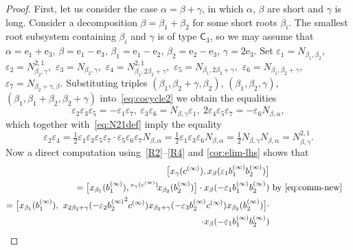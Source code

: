 \documentclass[oneside, 11pt]{amsart}
\numberwithin{equation}{section}
\theoremstyle{definition}
\theoremstyle{remark}
\newcommand{\up}[2]{{^{#1}\!{#2}}}
\newcommand{\rC}{\mathsf{C}}
\begin{document}
\begin{proof}
First, let us consider the case \(\alpha = \beta + \gamma\), in which \(\alpha\), \(\beta\) are short and \(\gamma\) is long. Consider a decomposition \(\beta = \beta_1 + \beta_2\) for some short roots \(\beta_i\). The smallest root subsystem containing \(\beta_i\) and \(\gamma\) is of type \(\rC_3\), so we may assume that \(\alpha = \mathrm e_1 + \mathrm e_3\), \(\beta = \mathrm e_1 - \mathrm e_3\), \(\beta_1 = \mathrm e_1 - \mathrm e_2\), \(\beta_2 = \mathrm e_2 - \mathrm e_3\), \(\gamma = 2\mathrm e_3\). Set $\varepsilon_1 = N_{\beta_1, \beta_2},$ $\varepsilon_2 = N_{\beta_2,\gamma}^{2,1},$ $\varepsilon_3 = N_{\beta_2, \gamma},$ $\varepsilon_4 = N_{\beta_1, 2\beta_2+\gamma}^{2,1},$ $\varepsilon_5 = N_{\beta_1, 2\beta_2+\gamma},$ $\varepsilon_6 = N_{\beta_1,\beta_2+\gamma},$ $\varepsilon_7 = N_{\beta_2+\gamma, \beta}.$
Substituting triples $(\beta_1, \beta_2+\gamma, \beta_2)$, $(\beta_1, \beta_2, \gamma)$, $(\beta_1, \beta_1+\beta_2, \beta_2+\gamma)$ into~\eqref{eq:cocycle2} we obtain the equalities 
\begin{equation*} \varepsilon_2 \varepsilon_3 \varepsilon_5 = - \varepsilon_1 \varepsilon_7,\ \varepsilon_3 \varepsilon_6  = N_{\beta, \gamma}\varepsilon_1,\ 2 \varepsilon_4 \varepsilon_5 \varepsilon_7 = - \varepsilon_6 N_{\beta,\alpha},\end{equation*}
which together with~\eqref{eq:N21def} imply the equality 
\begin{equation*}  \varepsilon_2 \varepsilon_4 = \tfrac{1}{2} \varepsilon_1 \varepsilon_3 \varepsilon_5 \varepsilon_7 \cdot \varepsilon_5 \varepsilon_6 \varepsilon_7 N_{\beta,\alpha}= \tfrac{1}{2} \varepsilon_1 \varepsilon_3 \varepsilon_6 N_{\beta, \alpha} = \tfrac{1}{2} N_{\beta,\gamma} N_{\beta,\alpha}= N_{\beta, \gamma}^{2, 1}.\end{equation*}
Now a direct computation using~\eqref{R2}--\eqref{R4} and \cref{cor:elim-lhs} shows that
\begin{align*}
  \bigl[x_\gamma(c^{(\infty)}), x_\beta(\varepsilon_1 b_1^{(\infty)} b_2^{(\infty)})\bigr] \\ = \bigl[x_{\beta_1}(b_1^{(\infty)}), \up{x_\gamma(c^{(\infty)})} {x_{\beta_2}(b_2^{(\infty)})}\bigr]\cdot x_\beta(-\varepsilon_1 b_1^{(\infty)} b_2^{(\infty)}) & \text{ by~\eqref{eq:comm-new}} \\
  = \bigl[x_{\beta_1}(b_1^{(\infty)}),\ x_{2\beta_2+\gamma}(-\varepsilon_2{b_2^{(\infty)}}^2c^{(\infty)}) x_{\beta_2+\gamma}(-\varepsilon_3b_2^{(\infty)}c^{(\infty)}) x_{\beta_2}(b_2^{(\infty)})\bigr] \cdot \\ \cdot x_{\beta}(-\varepsilon_1b_1^{(\infty)}b_2^{(\infty)})

\end{align*}
\end{proof}
\end{document}
